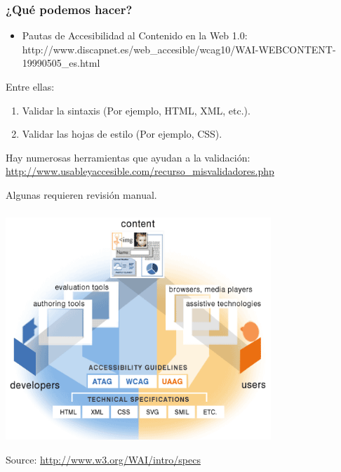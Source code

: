 \begin{frame}
\frametitle{¿Qué podemos hacer?}

\begin{itemize}
  \item Pautas de Accesibilidad al Contenido en la Web 1.0: http://www.discapnet.es/web_accesible/wcag10/WAI-WEBCONTENT-19990505_es.html
\end{itemize}

Entre ellas:

\begin{enumerate}
   \item Validar la sintaxis (Por ejemplo, HTML, XML, etc.).
   \item Validar las hojas de estilo (Por ejemplo, CSS).
\end{enumerate}

Hay numerosas herramientas que ayudan a la validación: \url{http://www.usableyaccesible.com/recurso\_misvalidadores.php}

Algunas requieren revisión manual.

\end{frame}



\begin{frame}
\frametitle{}

\begin{center}
  \includegraphics[width=10cm]{figs/accesibilidad.png}
\end{center}


\begin{flushright}
{\tiny
Source: \url{http://www.w3.org/WAI/intro/specs}
}
\end{flushright}

\end{frame}


